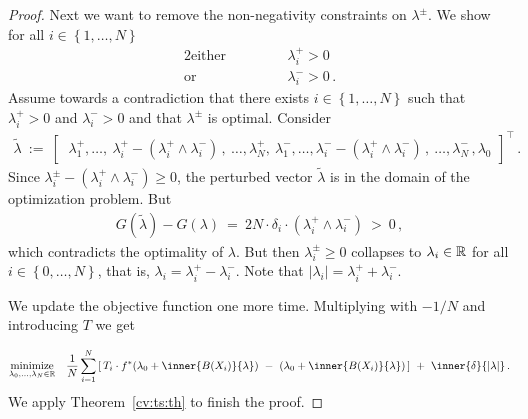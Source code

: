 \begin{proof}
  Next we want to remove the non-negativity constraints on $\lambda^\pm$.
  We show 
  for all $i \in \left\{ 1,\ldots,N \right\}$
\begin{alignat*}{2}
  \text{either}
  &
  &&
  \qquad
      \lambda_i^+ > 0
  \\
  \text{or}
  &
  &&
  \qquad
      \lambda_i^- > 0
  \,.
\end{alignat*}
Assume towards a contradiction that 
there exists
$i \in \left\{ 1,\ldots,N \right\}$
such that
$
      \lambda_i^+ > 0
$
and
$
      \lambda_i^- > 0
$ 
and that 
$\lambda^\pm$ is optimal.
Consider
  \begin{gather}
    \tilde{\lambda}
    \ 
    :=
    \ 
    \begin{bmatrix}
      \ 
      \lambda_1^+,
      \ldots,
      \ 
      \lambda_i^+
      \!
      -
      (
      \lambda_i^+
      \!
      \land
      \lambda_i^-
      )\,,
      \ 
      \ldots,
      \lambda_N^+,
      \ 
      \lambda_1^-,
      \ldots,
      \lambda_i^-
      \!
      -
      (
      \lambda_i^+
      \!
      \land
      \lambda_i^-
      )\,,
      \ 
      \ldots,
      \lambda_N^-
      \,,
      \lambda_0
    \end{bmatrix}
    ^\top
    \,.
  \end{gather}
  Since 
  $
      \lambda_i^\pm
      -
      (
      \lambda_i^+
      \!
      \land
      \lambda_i^-
      )
      \ge 
      0
  $,
  the perturbed vector $\tilde{\lambda}$ is in the domain of the 
  optimization problem.
  But 
  \begin{align}
  G(\tilde{\lambda})
  -
  G(\lambda)
  \ 
  =
  \ 
  2
  N
  \cdot
  \delta_i
  \cdot
      (
      \lambda_i^+
      \!
      \land
      \lambda_i^-
      )
  \ 
  >
  \ 
  0
  \,,
  \end{align}
  which contradicts the optimality of $\lambda$.
But then 
$
\lambda^\pm_i
\ge 0
$
collapses to
$
\lambda_i\in \mathbb{R}
$ 
for all
$i\in \left\{ 0,\ldots,N \right\}$, that is,
$ \lambda_i=\lambda_i^+\!-\lambda_i^- $.
Note that
$ |\lambda_i|=\lambda_i^+\!+\lambda_i^- $.

We update the objective function one more time.
Multiplying with $-1/N$ and introducing $T$ we get

\begin{gather*}
  \underset
  {\lambda_0,\ldots,\lambda_{N}\in \R}
  {
    \mathrm{minimize}
  }
  \quad
  \frac{1}{N}
\sum_{i=1} 
  ^N
  \left[ 
    \,
  T_i
  \cdot
  f^*
  \!
  \left( 
\lambda_0
+
\inner
{B(X_i)}
{\lambda}
  \right)
  \ 
-
\ 
  \left( 
\lambda_0
+
\inner
{B(X_i)}
{\lambda}
  \right)
  \,
  \right]
  \ 
+
\ 
\inner
{\delta}
{|\lambda|}
  \,.
\end{gather*}
We apply Theorem~\ref{cv:ts:th} to finish the proof.
\end{proof}
